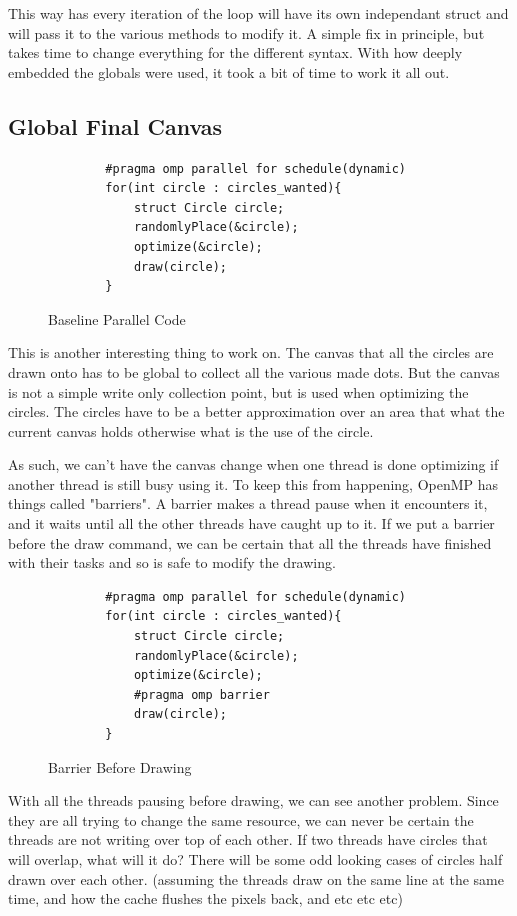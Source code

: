 \documentclass[12pt]{article}
\begin{document}
This way has every iteration of the loop will have its own independant struct and will pass it to the various methods to modify it.
A simple fix in principle, but takes time to change everything for the different syntax.
With how deeply embedded the globals were used, it took a bit of time to work it all out.

\newpage
\subsection{Global Final Canvas}

\begin{figure}[htb]
	\centering
	\begin{verbatim}
		#pragma omp parallel for schedule(dynamic)
		for(int circle : circles_wanted){
			struct Circle circle;
			randomlyPlace(&circle);
			optimize(&circle);
			draw(circle);
		}
	\end{verbatim}
	\caption{Baseline Parallel Code}
\end{figure}

This is another interesting thing to work on.
The canvas that all the circles are drawn onto has to be global to collect all the various made dots.
But the canvas is not a simple write only collection point, but is used when optimizing the circles.
The circles have to be a better approximation over an area that what the current canvas holds otherwise what is the use of the circle.

As such, we can't have the canvas change when one thread is done optimizing if another thread is still busy using it.
To keep this from happening, OpenMP has things called "barriers".
A barrier makes a thread pause when it encounters it, and it waits until all the other threads have caught up to it.
If we put a barrier before the draw command, we can be certain that all the threads have finished with their tasks and so is safe to modify the drawing.

\begin{figure}[htb]
	\centering
	\begin{verbatim}
		#pragma omp parallel for schedule(dynamic)
		for(int circle : circles_wanted){
			struct Circle circle;
			randomlyPlace(&circle);
			optimize(&circle);
			#pragma omp barrier
			draw(circle);
		}
	\end{verbatim}
	\caption{Barrier Before Drawing}
\end{figure}

With all the threads pausing before drawing, we can see another problem.
Since they are all trying to change the same resource, we can never be certain the threads are not writing over top of each other.
If two threads have circles that will overlap, what will it do?
There will be some odd looking cases of circles half drawn over each other.
(assuming the threads draw on the same line at the same time, and how the cache flushes the pixels back, and etc etc etc)
\end{document}
